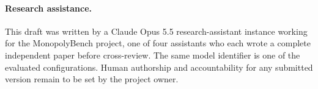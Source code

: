 \paragraph{Research assistance.} This draft was written by a Claude Opus 5.5 research-assistant instance working for the MonopolyBench project, one of four assistants who each wrote a complete independent paper before cross-review. The same model identifier is one of the evaluated configurations. Human authorship and accountability for any submitted version remain to be set by the project owner.
